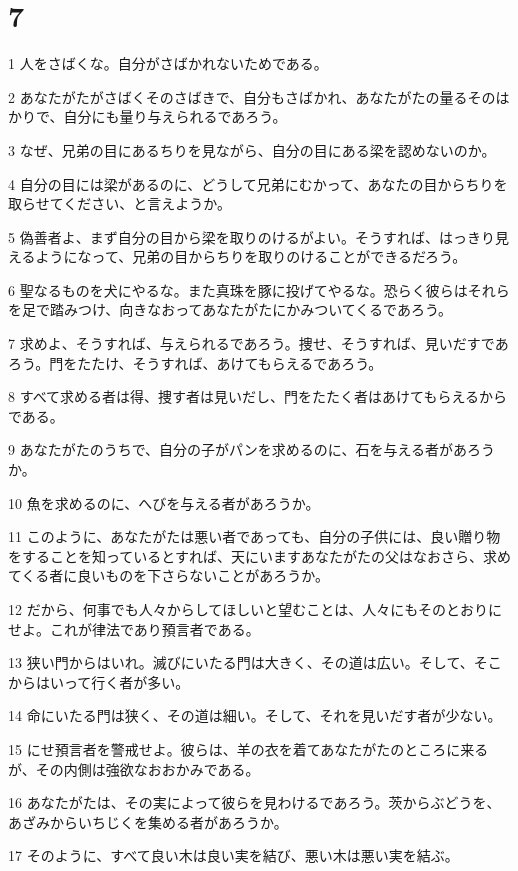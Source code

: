 \chapter{7}

\par 1 人をさばくな。自分がさばかれないためである。
\par 2 あなたがたがさばくそのさばきで、自分もさばかれ、あなたがたの量るそのはかりで、自分にも量り与えられるであろう。
\par 3 なぜ、兄弟の目にあるちりを見ながら、自分の目にある梁を認めないのか。
\par 4 自分の目には梁があるのに、どうして兄弟にむかって、あなたの目からちりを取らせてください、と言えようか。
\par 5 偽善者よ、まず自分の目から梁を取りのけるがよい。そうすれば、はっきり見えるようになって、兄弟の目からちりを取りのけることができるだろう。
\par 6 聖なるものを犬にやるな。また真珠を豚に投げてやるな。恐らく彼らはそれらを足で踏みつけ、向きなおってあなたがたにかみついてくるであろう。
\par 7 求めよ、そうすれば、与えられるであろう。捜せ、そうすれば、見いだすであろう。門をたたけ、そうすれば、あけてもらえるであろう。
\par 8 すべて求める者は得、捜す者は見いだし、門をたたく者はあけてもらえるからである。
\par 9 あなたがたのうちで、自分の子がパンを求めるのに、石を与える者があろうか。
\par 10 魚を求めるのに、へびを与える者があろうか。
\par 11 このように、あなたがたは悪い者であっても、自分の子供には、良い贈り物をすることを知っているとすれば、天にいますあなたがたの父はなおさら、求めてくる者に良いものを下さらないことがあろうか。
\par 12 だから、何事でも人々からしてほしいと望むことは、人々にもそのとおりにせよ。これが律法であり預言者である。
\par 13 狭い門からはいれ。滅びにいたる門は大きく、その道は広い。そして、そこからはいって行く者が多い。
\par 14 命にいたる門は狭く、その道は細い。そして、それを見いだす者が少ない。
\par 15 にせ預言者を警戒せよ。彼らは、羊の衣を着てあなたがたのところに来るが、その内側は強欲なおおかみである。
\par 16 あなたがたは、その実によって彼らを見わけるであろう。茨からぶどうを、あざみからいちじくを集める者があろうか。
\par 17 そのように、すべて良い木は良い実を結び、悪い木は悪い実を結ぶ。

